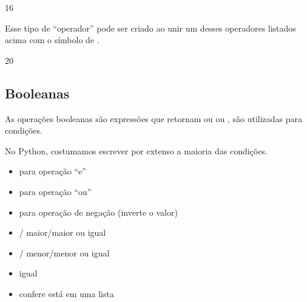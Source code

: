 \documentclass[letterpaper,10pt,english]{jupyterBook}
\begin{document}
\begin{sphinxVerbatim}[commandchars=\\\{\}]
16
\end{sphinxVerbatim}

\sphinxAtStartPar
Esse tipo de “operador” pode ser criado ao unir um desses operadores listados acima com o símbolo de \sphinxcode{\sphinxupquote{=}}.

\begin{sphinxVerbatim}[commandchars=\\\{\}]
  
  
\end{sphinxVerbatim}

\begin{sphinxVerbatim}[commandchars=\\\{\}]
20
\end{sphinxVerbatim}


\subsection{Booleanas}
\label{\detokenize{chapters/2:booleanas}}
\sphinxAtStartPar
As operações booleanas são expressões que retornam ou  ou , são utilizadas para condições.

\sphinxAtStartPar
No Python, costumamos escrever por extenso a maioria das condições.
\begin{itemize}
\item {} 
\sphinxAtStartPar
{} para operação “e”

\item {} 
\sphinxAtStartPar
{} para operação “ou”

\item {} 
\sphinxAtStartPar
{} para operação de negação (inverte o valor)

\item {} 
\sphinxAtStartPar
\sphinxcode{\sphinxupquote{>}}/\sphinxcode{\sphinxupquote{>=}} maior/maior ou igual

\item {} 
\sphinxAtStartPar
\sphinxcode{\sphinxupquote{<}}/\sphinxcode{\sphinxupquote{<=}} menor/menor ou igual

\item {} 
\sphinxAtStartPar
\sphinxcode{\sphinxupquote{==}} igual

\item {} 
\sphinxAtStartPar
{}confere está em uma lista

\end{itemize}
\end{document}
